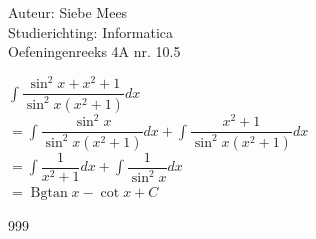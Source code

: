 \documentclass[a4paper]{article}
\newcommand{\Bgtan}{\operatorname{Bgtan}}
\begin{document}
  
\noindent \large Auteur: Siebe Mees \\
\noindent \large Studierichting: Informatica\\
\noindent \large Oefeningenreeks 4A nr. 10.5\\

\medskip

\normalsize

$ \displaystyle\int \dfrac{\sin^2 x + x^2 + 1}{\sin^2 x(x^2 + 1)}dx $\\

$ = \displaystyle\int \dfrac{\sin^2 x}{\sin^2 x(x^2 + 1)}dx + \displaystyle\int \dfrac{x^2 + 1}{\sin^2 x(x^2 + 1)}dx $\\

$ = \displaystyle\int \dfrac{1}{x^2 + 1}dx + \displaystyle\int \dfrac{1}{\sin^2 x}dx $\\

$ = \Bgtan x - \cot x + C $\\

\begin{thebibliography}{999}
\end{thebibliography}
\end{document}
